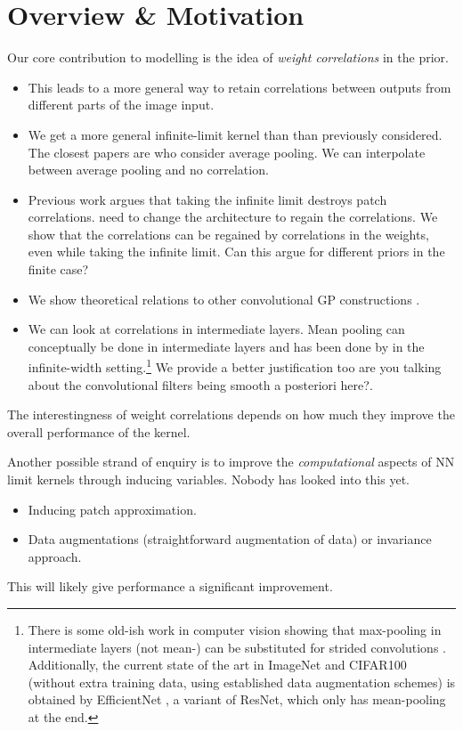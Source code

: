 \documentclass{article} %
\newcommand{\adrianote}[1]{{\color{blue}#1}}
\begin{document}
\section{Overview \& Motivation}
Our core contribution to modelling is the idea of \emph{weight correlations} in the prior.
\begin{itemize}
    \item This leads to a more general way to retain correlations between outputs from different parts of the image input.
    \item We get a more general infinite-limit kernel than than previously considered. The closest papers are \citet{arora2019exact,li2019enhanced,shankar2020} who consider average pooling. We can interpolate between average pooling and no correlation.
    \item Previous work argues that taking the infinite limit destroys patch correlations. \citet{arora2019exact,li2019enhanced,shankar2020} need to change the architecture to regain the correlations. We show that the correlations can be regained by correlations in the weights, even while taking the infinite limit. Can this argue for different priors in the finite case?
    \item We show theoretical relations to other convolutional GP constructions \citep{markvdw2017convolutional,dutordoir2019tick}.
    \item We can look at correlations in intermediate layers. Mean pooling can conceptually be done in intermediate layers and \adrianote{has been done by \citet{shankar2020} in the infinite-width setting.}\footnote{There is some old-ish work in computer vision showing that max-pooling in intermediate layers (not mean-) can be substituted for strided convolutions \citep{springenberg14allconv}. Additionally, the current state of the art in ImageNet and CIFAR100  (without extra training data, using established data augmentation schemes) is obtained by EfficientNet \citep{tan19efficientnet}, a variant of ResNet, which only has mean-pooling at the end.} We provide a better justification too \adrianote{are you talking about the convolutional filters being smooth a posteriori here?}.
\end{itemize}
The interestingness of weight correlations depends on how much they improve the overall performance of the kernel.

Another possible strand of enquiry is to improve the \emph{computational} aspects of NN limit kernels through inducing variables. Nobody has looked into this yet.
\begin{itemize}
    \item Inducing patch approximation.
    \item Data augmentations (straightforward augmentation of data) or invariance approach.
\end{itemize}
This will likely give performance a significant improvement.
\end{document}
